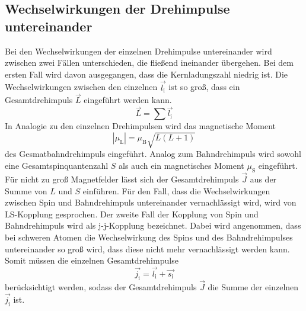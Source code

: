 \subsection{Wechselwirkungen der Drehimpulse untereinander}
Bei den Wechselwirkungen der einzelnen Drehimpulse untereinander wird zwischen zwei Fällen unterschieden, die fließend ineinander übergehen. Bei dem ersten Fall wird davon ausgegangen, dass die Kernladungszahl niedrig ist. Die Wechselwirkungen zwischen den einzelnen $\vec{l_\text{i}}$ ist so groß, dass ein Gesamtdrehimpuls $\vec{L}$ eingeführt werden kann.
\begin{equation}
  \vec{L} = \sum \vec{l_\text{i}}
  \label{eqn:L}
\end{equation}
In Analogie zu den einzelnen Drehimpulsen wird das magnetische Moment
\begin{equation}
  |\mu_\text{L}| = \mu_\text{B} \sqrt{L(L+1)}
  \label{magL}
\end{equation}
des Gesmatbahndrehimpuls eingeführt. Analog zum Bahndrehimpuls wird sowohl eine Gesamtspinquantenzahl $S$ als auch ein magnetisches Moment $\mu_\text{S}$ eingeführt. Für nicht zu groß Magnetfelder lässt sich der Gesamtdrehimpuls $\vec{J}$ aus der Summe von $L$ und $S$ einführen. Für den Fall, dass die Wechselwirkungen zwischen Spin und Bahndrehimpuls untereinander vernachlässigt wird, wird von LS-Kopplung gesprochen.
Der zweite Fall der Kopplung von Spin und Bahndrehimpuls wird als j-j-Kopplung bezeichnet. Dabei wird angenommen, dass bei schweren Atomen die Wechselwirkung des Spins und des Bahndrehimpulses untereinander so groß wird, dass diese nicht mehr vernachlässigt werden kann. Somit müssen die einzelnen Gesamtdrehimpulse
\begin{equation}
  \vec{j_\text{i}} = \vec{l_\text{i}} + \vec{s_\text{i}}
  \label{eqn:j}
\end{equation}
berücksichtigt werden, sodass der Gesamtdrehimpuls $\vec{J}$ die Summe der einzelnen $\vec{j_\text{i}}$ ist.

